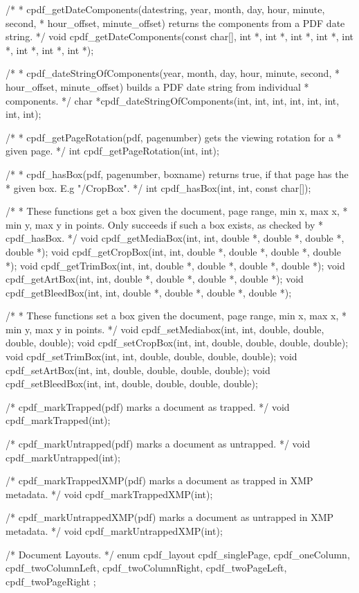/*
 * cpdf_getDateComponents(datestring, year, month, day, hour, minute, second,
 * hour_offset, minute_offset) returns the components from a PDF date string.
 */
void cpdf_getDateComponents(const char[], int *, int *, int *, int *, int *,
                            int *, int *, int *);

/*
 * cpdf_dateStringOfComponents(year, month, day, hour, minute, second,
 * hour_offset, minute_offset) builds a PDF date string from individual
 * components.
 */
char *cpdf_dateStringOfComponents(int, int, int, int, int, int, int, int);

/*
 * cpdf_getPageRotation(pdf, pagenumber) gets the viewing rotation for a
 * given page.
 */
int cpdf_getPageRotation(int, int);

/*
 * cpdf_hasBox(pdf, pagenumber, boxname) returns true, if that page has the
 * given box. E.g "/CropBox".
 */
int cpdf_hasBox(int, int, const char[]);

/*
 * These functions get a box given the document, page range, min x, max x,
 * min y, max y in points. Only succeeds if such a box exists, as checked by
 * cpdf_hasBox.
 */
void cpdf_getMediaBox(int, int, double *, double *, double *, double *);
void cpdf_getCropBox(int, int, double *, double *, double *, double *);
void cpdf_getTrimBox(int, int, double *, double *, double *, double *);
void cpdf_getArtBox(int, int, double *, double *, double *, double *);
void cpdf_getBleedBox(int, int, double *, double *, double *, double *);

/*
 * These functions set a box given the document, page range, min x, max x,
 * min y, max y in points.
 */
void cpdf_setMediabox(int, int, double, double, double, double);
void cpdf_setCropBox(int, int, double, double, double, double);
void cpdf_setTrimBox(int, int, double, double, double, double);
void cpdf_setArtBox(int, int, double, double, double, double);
void cpdf_setBleedBox(int, int, double, double, double, double);

/* cpdf_markTrapped(pdf) marks a document as trapped. */
void cpdf_markTrapped(int);

/* cpdf_markUntrapped(pdf) marks a document as untrapped. */
void cpdf_markUntrapped(int);

/* cpdf_markTrappedXMP(pdf) marks a document as trapped in XMP metadata. */
void cpdf_markTrappedXMP(int);

/* cpdf_markUntrappedXMP(pdf) marks a document as untrapped in XMP metadata. */
void cpdf_markUntrappedXMP(int);

/* Document Layouts. */
enum cpdf_layout {
  cpdf_singlePage,
  cpdf_oneColumn,
  cpdf_twoColumnLeft,
  cpdf_twoColumnRight,
  cpdf_twoPageLeft,
  cpdf_twoPageRight
};

